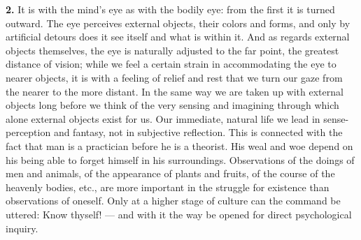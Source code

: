 \documentclass[12pt,a4paper]{book}
\newcommand{\opage}[1]{\marginnote{\footnotesize\textit{[#1]}}}
\begin{document}
\opage{2}\textbf{2.} It is with the mind's eye as with the bodily eye: from the
first it is turned outward. The eye perceives external objects, their
colors and forms, and only by artificial detours does it see itself and
what is within it. And as regards external objects themselves, the eye
is naturally adjusted to the far point, the greatest distance of vision;
while we feel a certain strain in accommodating the eye to nearer
objects, it is with a feeling of relief and rest that we turn our gaze
from the nearer to the more distant. In the same way we are taken up
with external objects long before we think of the very sensing and
imagining through which alone external objects exist for us. Our
immediate, natural life we lead in sense-perception and fantasy, not in
subjective reflection. This is connected with the fact that man is a
practician before he is a theorist. His weal and woe depend on his being
able to forget himself in his surroundings. Observations of the doings
of men and animals, of the appearance of plants and fruits, of the
course of the heavenly bodies, etc., are more important in the struggle
for existence than observations of oneself. Only at a higher stage of
culture can the command be uttered: Know thyself! --- and with it the
way be opened for direct psychological inquiry.
\end{document}
